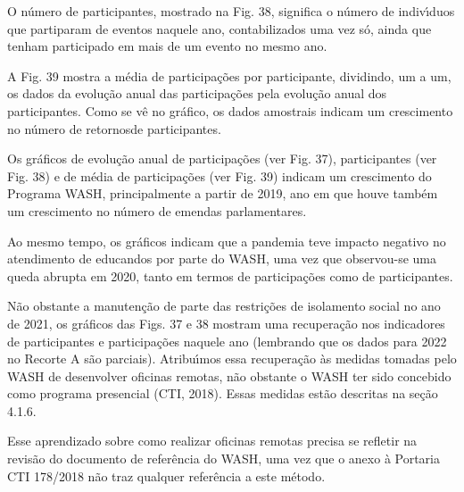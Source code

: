 \documentclass[
12pt,		%
openright,	%
twoside,  %
a4paper,			%
chapter=TITLE,		%
english,			%
french,				%
spanish,			%
brazil				%
]{USPSC-classe/USPSC}
\begin{document}
O n\'umero de participantes, mostrado na Fig. 38, significa o n\'umero de indiv\'{\i}duos que partiparam de eventos naquele ano, contabilizados uma vez s\'o, ainda que tenham participado em mais de um evento no mesmo ano.








A Fig. 39 mostra a m\'edia de participa\c{c}\~oes por participante, dividindo, um a um, os dados da evolu\c{c}\~ao anual das participa\c{c}\~oes pela evolu\c{c}\~ao anual dos participantes. Como se v\^e no gr\'afico, os dados amostrais indicam um crescimento no n\'umero de \textquotedbl retornos\textquotedbl  de participantes.








Os gr\'aficos de evolu\c{c}\~ao anual de participa\c{c}\~oes (ver Fig. 37), participantes (ver Fig. 38) e de m\'edia de participa\c{c}\~oes (ver Fig. 39) indicam um crescimento do Programa WASH, principalmente a partir de 2019, ano em que houve tamb\'em um crescimento no n\'umero de emendas parlamentares.








Ao mesmo tempo, os gr\'aficos indicam que a pandemia teve impacto negativo no atendimento de educandos por parte do WASH, uma vez que observou-se uma queda abrupta em 2020, tanto em termos de participa\c{c}\~oes como de participantes.








N\~ao obstante a manuten\c{c}\~ao de parte das restri\c{c}\~oes de isolamento social no ano de 2021, os gr\'aficos das Figs. 37 e 38 mostram uma recupera\c{c}\~ao nos indicadores de participantes e participa\c{c}\~oes naquele ano (lembrando que os dados para 2022 no Recorte A s\~ao parciais). Atribu\'{\i}mos essa recupera\c{c}\~ao \`as medidas tomadas pelo WASH de desenvolver oficinas remotas, n\~ao obstante o WASH ter sido concebido como programa presencial  (CTI, 2018). Essas medidas est\~ao descritas na se\c{c}\~ao 4.1.6.








Esse aprendizado sobre como realizar oficinas remotas precisa se refletir na revis\~ao do documento de refer\^encia do WASH, uma vez que o anexo \`a Portaria CTI 178/2018 n\~ao traz qualquer refer\^encia a este m\'etodo.
\end{document}
